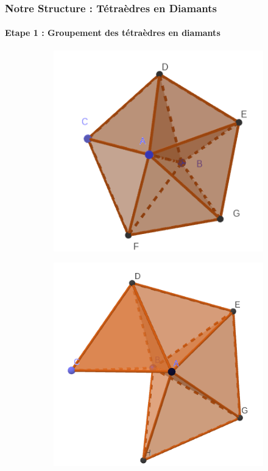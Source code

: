 \documentclass[9pt]{beamer}
\begin{document}
\begin{frame}
\small
\frametitle{Notre Structure : Tétraèdres en Diamants}
\framesubtitle{Etape 1 : Groupement des tétraèdres en diamants}
\begin{figure}[H]
\centering
\begin{subfigure}{.24\textwidth}
  \centering
  \includegraphics[scale=0.21]{Images/full_diamond}
  \caption{}
\end{subfigure}%
\begin{subfigure}{.24\textwidth}
  \centering
  \includegraphics[scale=0.17]{Images/not_full_diamond}
  \caption{}
\end{subfigure}
\begin{subfigure}{.24\textwidth}
  \centering

\end{subfigure}
\end{figure}
\end{frame}
\end{document}
